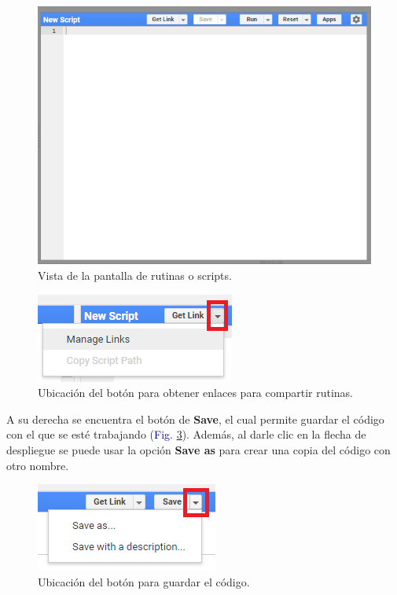 \documentclass[
  12pt,
  letterpaper,
  twoside]{book}
\begin{document}
\begin{figure}[H]

{\centering \includegraphics[width=0.7\linewidth]{Img/editor} 

}

\caption{Vista de la pantalla de rutinas o scripts.}\label{fig:f212}
\end{figure}

\begin{figure}[H]

{\centering \includegraphics[width=0.5\linewidth]{Img/links} 

}

\caption{Ubicación del botón para obtener enlaces para compartir rutinas.}\label{fig:f213}
\end{figure}

A su derecha se encuentra el botón de \textbf{Save}, el cual permite guardar el código con el que se esté trabajando (\textcolor{darkblue}{Fig.} \ref{fig:f214}). Además, al darle clic en la flecha de despliegue se puede usar la opción \textbf{Save as} para crear una copia del código con otro nombre.

\begin{figure}[H]

{\centering \includegraphics[width=0.5\linewidth]{Img/save} 

}

\caption{Ubicación del botón para guardar el código.}\label{fig:f214}
\end{figure}
\end{document}
